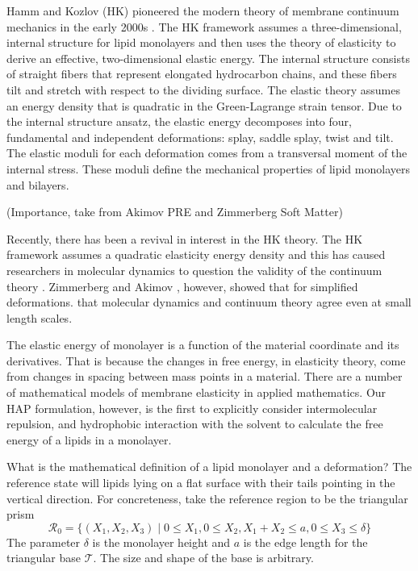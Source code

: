 Hamm and Kozlov (HK) pioneered the modern theory of membrane continuum mechanics in the early 2000s \cite{HaKo2000}.
The HK framework assumes a three-dimensional, internal structure for lipid monolayers and 
then uses the theory of elasticity to derive an effective, two-dimensional elastic energy.
The internal structure consists of straight fibers that represent elongated hydrocarbon chains, and these fibers
tilt and stretch with respect to the dividing surface. The elastic theory assumes an energy density that is
quadratic in the Green-Lagrange strain tensor. Due to the internal structure ansatz, the elastic energy decomposes into
four, fundamental and independent deformations: splay, saddle splay, twist and tilt.
The elastic moduli for each deformation comes from a transversal moment of the internal stress.
These moduli define the mechanical properties of lipid monolayers and bilayers.

(Importance, take from Akimov PRE and Zimmerberg Soft Matter)

Recently, there has been a revival in interest in the HK theory. The HK framework assumes a quadratic
elasticity energy density and this has caused researchers in molecular dynamics to question the validity of
the continuum theory \cite{PRL}. Zimmerberg and Akimov \cite{}, however, showed that for simplified deformations.
that molecular dynamics and continuum theory agree even at small length scales. 

The elastic energy of monolayer is a function of the material coordinate and its derivatives. 
That is because the changes in free energy, in elasticity theory, come from changes in spacing between mass points in a material.
There are a number of mathematical models of membrane elasticity in applied mathematics. Our HAP formulation, however,
is the first to explicitly consider intermolecular repulsion, and hydrophobic interaction with the solvent 
to calculate the free energy of a lipids in a monolayer.

What is the mathematical definition of a lipid monolayer and a deformation? 
The reference state will lipids lying on a flat surface with their tails pointing in the 
vertical direction. For concreteness, take the reference region to be the triangular prism 
\begin{equation}
\mathcal{R}_0 = \{(X_1, X_2, X_3) \mid 0 \leq X_1, 0 \leq X_2, X_1 + X_2 \leq a, 0 \leq X_3 \leq \delta \}
\end{equation}
The parameter $\delta$ is the monolayer height and $a$ is the edge length for the triangular base $\mathcal{T}$. 
The size and shape of the base is arbitrary. 

